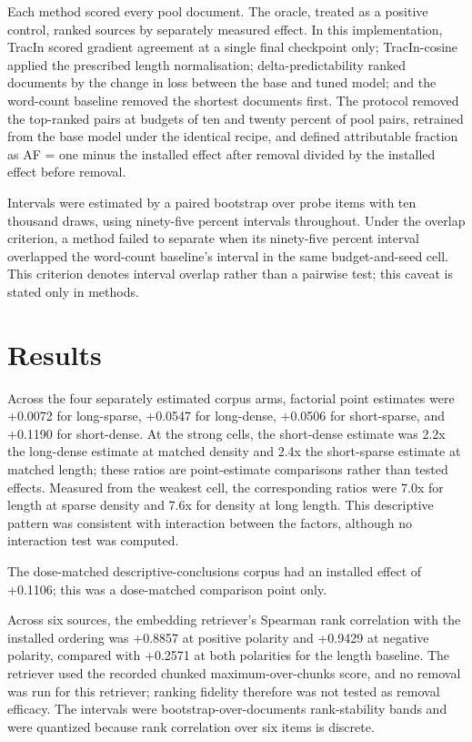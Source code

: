 \documentclass[10pt]{article}
\begin{document}
Each method scored every pool document. The oracle, treated as a positive control, ranked sources by separately measured effect. In this implementation, TracIn scored gradient agreement at a single final checkpoint only; TracIn-cosine applied the prescribed length normalisation; delta-predictability ranked documents by the change in loss between the base and tuned model; and the word-count baseline removed the shortest documents first. The protocol removed the top-ranked pairs at budgets of ten and twenty percent of pool pairs, retrained from the base model under the identical recipe, and defined attributable fraction as AF = one minus the installed effect after removal divided by the installed effect before removal.



Intervals were estimated by a paired bootstrap over probe items with ten thousand draws, using ninety-five percent intervals throughout. Under the overlap criterion, a method failed to separate when its ninety-five percent interval overlapped the word-count baseline's interval in the same budget-and-seed cell. This criterion denotes interval overlap rather than a pairwise test; this caveat is stated only in methods.







\section{ Results }
\label{sec:results}

Across the four separately estimated corpus arms, factorial point estimates were +0.0072 for long-sparse, +0.0547 for long-dense, +0.0506 for short-sparse, and +0.1190 for short-dense. At the strong cells, the short-dense estimate was 2.2x the long-dense estimate at matched density and 2.4x the short-sparse estimate at matched length; these ratios are point-estimate comparisons rather than tested effects. Measured from the weakest cell, the corresponding ratios were 7.0x for length at sparse density and 7.6x for density at long length. This descriptive pattern was consistent with interaction between the factors, although no interaction test was computed.



The dose-matched descriptive-conclusions corpus had an installed effect of +0.1106; this was a dose-matched comparison point only.



Across six sources, the embedding retriever’s Spearman rank correlation with the installed ordering was +0.8857 at positive polarity and +0.9429 at negative polarity, compared with +0.2571 at both polarities for the length baseline. The retriever used the recorded chunked maximum-over-chunks score, and no removal was run for this retriever; ranking fidelity therefore was not tested as removal efficacy. The intervals were bootstrap-over-documents rank-stability bands and were quantized because rank correlation over six items is discrete.
\end{document}

